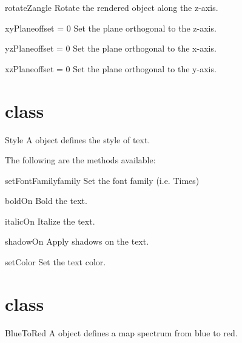 \begin{methoddesc}[Transform]{rotateZ}{angle}
Rotate the rendered object along the z-axis.
\end{methoddesc}

\begin{methoddesc}[Transform]{xyPlane}{offset = 0}
Set the plane orthogonal to the z-axis.
\end{methoddesc}

\begin{methoddesc}[Transform]{yzPlane}{offset = 0}
Set the plane orthogonal to the x-axis.
\end{methoddesc}

\begin{methoddesc}[Transform]{xzPlane}{offset = 0}
Set the plane orthogonal to the y-axis.
\end{methoddesc}

\section{\Style class}
\begin{classdesc}{Style}{}
A \Style object defines the style of text.
\end{classdesc}

The following are the methods available:
\begin{methoddesc}[Style]{setFontFamily}{family}
Set the font family (i.e. Times)
\end{methoddesc}

\begin{methoddesc}[Style]{boldOn}{}
Bold the text.
\end{methoddesc}

\begin{methoddesc}[Style]{italicOn}{}
Italize the text.
\end{methoddesc}

\begin{methoddesc}[Style]{shadowOn}{}
Apply shadows on the text.
\end{methoddesc}

\begin{methoddesc}[Style]{setColor}{}
Set the text color.
\end{methoddesc}

\section{\BlueToRed class}
\begin{classdesc}{BlueToRed}{}
A \BlueToRed object defines a map spectrum from blue to red.
\end{classdesc}

